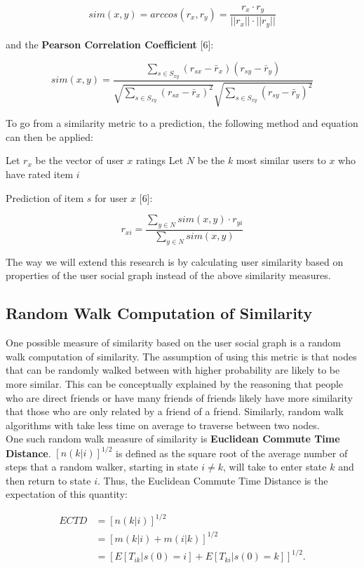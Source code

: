 \documentclass[10pt]{article}
\begin{document}
$$ sim(x, y) = arccos(r_{x}, r_{y}) = \frac{r_{x} \cdot r_{y}}{||r_{x}|| \cdot ||r_{y}||} $$

and the \textbf{Pearson Correlation Coefficient} [6]:

$$ sim(x, y) = \frac{\sum_{s \in S_{xy}}(r_{sx} - \bar r_{x})(r_{sy} - \bar r_{y})}{\sqrt{\sum_{s \in S_{xy}}(r_{sx} - \bar r_{x})^{2}} \sqrt{\sum_{s \in S_{xy}}(r_{sy} - \bar r_{y})^{2}}} $$

To go from a similarity metric to a prediction, the following method and equation can then be applied:

Let $r_{x}$ be the vector of user $x$ ratings
Let $N$ be the $k$ most similar users to $x$ who have rated item $i$

Prediction of item $s$ for user $x$ [6]:

$$ r_{xi} = \frac{\sum_{y \in N} sim(x, y) \cdot r_{yi}}{\sum_{y \in N} sim(x, y)} $$

The way we will extend this research is by calculating user similarity based on properties of the user social graph instead of the above similarity measures.

\subsection{Random Walk Computation of Similarity}

One possible measure of similarity based on the user social graph is a random walk computation of similarity. The assumption of using this metric is that nodes that can be randomly walked between with higher probability are likely to be more similar. This can be conceptually explained by the reasoning that people who are direct friends or have many friends of friends likely have more similarity that those who are only related by a friend of a friend. Similarly, random walk algorithms with take less time on average to traverse between two nodes. \\

One such random walk measure of similarity is \textbf{Euclidean Commute Time Distance}. $[n(k|i)]^{1/2}$ is defined as the square root of the average number of steps that a random walker, starting in state $i \neq k$, will take to enter state $k$ and then return to state $i$. Thus, the Euclidean Commute Time Distance is the expectation of this quantity:

\begin{equation}
\begin{aligned}
ECTD &= [n(k|i)]^{1/2} \\
&= [m(k|i) + m(i|k)]^{1/2} \\
&= [E[T_{ik} | s(0) = i] + E[T_{ki} | s(0) = k]]^{1/2}.
\end{aligned}
\end{equation}
\end{document}
